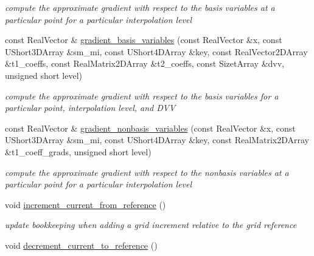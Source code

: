 \begin{DoxyCompactItemize}
\begin{DoxyCompactList}\small\item\em compute the approximate gradient with respect to the basis variables at a particular point for a particular interpolation level \end{DoxyCompactList}\item 
const Real\+Vector \& \hyperlink{classPecos_1_1HierarchInterpPolyApproximation_a9139778c2ccb10bbab1e39350d83723f}{gradient\+\_\+basis\+\_\+variables} (const Real\+Vector \&x, const U\+Short3\+D\+Array \&sm\+\_\+mi, const U\+Short4\+D\+Array \&key, const Real\+Vector2\+D\+Array \&t1\+\_\+coeffs, const Real\+Matrix2\+D\+Array \&t2\+\_\+coeffs, const Sizet\+Array \&dvv, unsigned short level)\label{classPecos_1_1HierarchInterpPolyApproximation_a9139778c2ccb10bbab1e39350d83723f}

\begin{DoxyCompactList}\small\item\em compute the approximate gradient with respect to the basis variables for a particular point, interpolation level, and D\+VV \end{DoxyCompactList}\item 
const Real\+Vector \& \hyperlink{classPecos_1_1HierarchInterpPolyApproximation_a1de3411a13a420dc114cd02c96ebc4d2}{gradient\+\_\+nonbasis\+\_\+variables} (const Real\+Vector \&x, const U\+Short3\+D\+Array \&sm\+\_\+mi, const U\+Short4\+D\+Array \&key, const Real\+Matrix2\+D\+Array \&t1\+\_\+coeff\+\_\+grads, unsigned short level)\label{classPecos_1_1HierarchInterpPolyApproximation_a1de3411a13a420dc114cd02c96ebc4d2}

\begin{DoxyCompactList}\small\item\em compute the approximate gradient with respect to the nonbasis variables at a particular point for a particular interpolation level \end{DoxyCompactList}\item 
void \hyperlink{classPecos_1_1HierarchInterpPolyApproximation_a109b517f8ff17e6706d3d4fdb9e76961}{increment\+\_\+current\+\_\+from\+\_\+reference} ()\label{classPecos_1_1HierarchInterpPolyApproximation_a109b517f8ff17e6706d3d4fdb9e76961}

\begin{DoxyCompactList}\small\item\em update bookkeeping when adding a grid increment relative to the grid reference \end{DoxyCompactList}\item 
void \hyperlink{classPecos_1_1HierarchInterpPolyApproximation_a06231ad34b1b67dbcb03127186bf3a06}{decrement\+\_\+current\+\_\+to\+\_\+reference} ()\label{classPecos_1_1HierarchInterpPolyApproximation_a06231ad34b1b67dbcb03127186bf3a06}


\end{DoxyCompactItemize}
